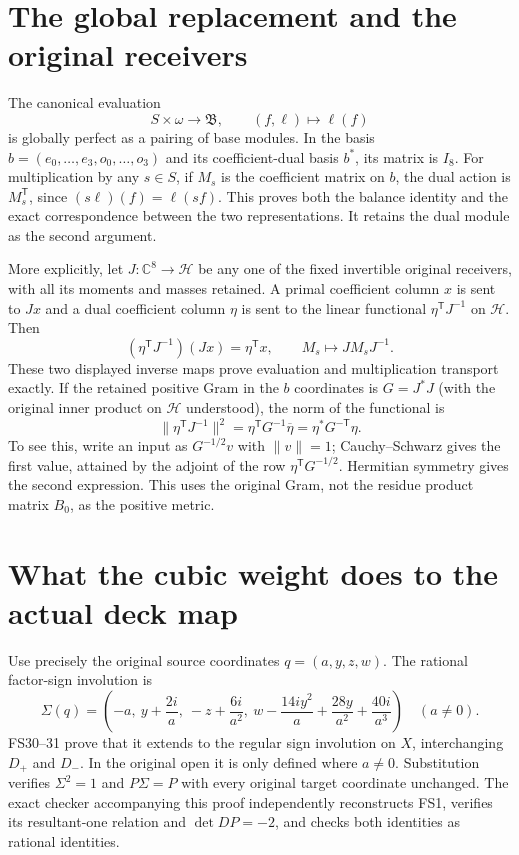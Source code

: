 \documentclass[11pt]{article}
\newcommand{\C}{\mathbb C}
\begin{document}
\section{The global replacement and the original receivers}
The canonical evaluation
\begin{equation}
 S\times\omega\longrightarrow\mathfrak B,
 \qquad (f,\ell)\longmapsto\ell(f)
 \tag{GDR15}
\end{equation}
is globally perfect as a pairing of base modules. In the basis
$b=(e_0,\ldots,e_3,o_0,\ldots,o_3)$ and its coefficient-dual
basis $b^*$, its matrix is $I_8$. For multiplication by any
$s\in S$, if $M_s$ is the coefficient matrix on $b$, the
dual action is $M_s^{\mathsf T}$, since
$(s\ell)(f)=\ell(sf)$. This proves both the balance identity
and the exact correspondence between the two representations.
It retains the dual module as the second argument.

More explicitly, let $J:\C^8\to\mathcal H$ be any one of
the fixed invertible original receivers, with all its moments
and masses retained. A primal coefficient column $x$ is sent
to $Jx$ and a dual coefficient column $\eta$ is sent to the
linear functional $\eta^{\mathsf T}J^{-1}$ on $\mathcal H$.
Then
\begin{equation}
 (\eta^{\mathsf T}J^{-1})(Jx)=\eta^{\mathsf T}x,
 \qquad M_s\longmapsto JM_sJ^{-1}.
 \tag{GDR16}
\end{equation}
These two displayed inverse maps prove evaluation and
multiplication transport exactly. If the retained positive
Gram in the $b$ coordinates is $G=J^*J$ (with the original
inner product on $\mathcal H$ understood), the norm of the
functional is
\begin{equation}
 \|\eta^{\mathsf T}J^{-1}\|^2
   =\eta^{\mathsf T}G^{-1}\overline\eta
   =\eta^*G^{-\mathsf T}\eta.
 \tag{GDR17}
\end{equation}
To see this, write an input as $G^{-1/2}v$ with $\|v\|=1$;
Cauchy--Schwarz gives the first value, attained by the
adjoint of the row $\eta^{\mathsf T}G^{-1/2}$. Hermitian
symmetry gives the second expression. This uses the original
Gram, not the residue product matrix $B_0$, as the positive
metric.

\section{What the cubic weight does to the actual deck map}
Use precisely the original source coordinates $q=(a,y,z,w)$.
The rational factor-sign involution is
\begin{equation}
 \Sigma(q)=\left(-a,\ y+\frac{2i}{a},\ -z+\frac{6i}{a^2},\
 w-\frac{14iy^2}{a}+\frac{28y}{a^2}+\frac{40i}{a^3}\right)
 \quad(a\ne0).
 \tag{GDR18}
\end{equation}
FS30--31 prove that it extends to the regular sign involution
on $X$, interchanging $D_+$ and $D_-$. In the original open
it is only defined where $a\ne0$. Substitution verifies
$\Sigma^2=1$ and $P\Sigma=P$ with every original target
coordinate unchanged. The exact checker accompanying this
proof independently reconstructs FS1, verifies its
resultant-one relation and $\det DP=-2$, and checks both
identities as rational identities.
\end{document}
